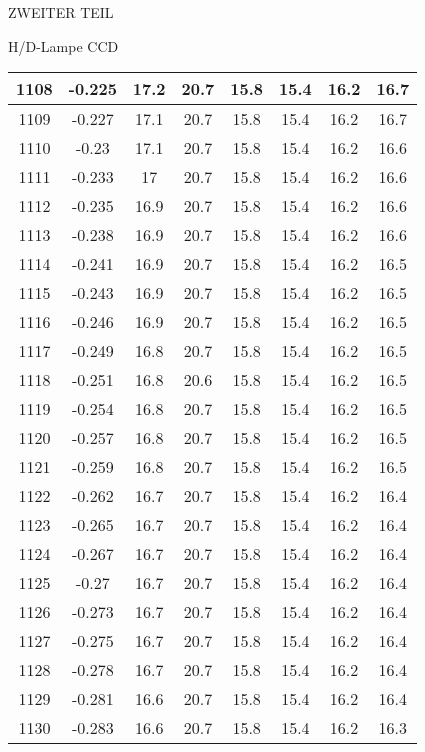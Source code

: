 \begin{appendix}
\begin{chapter}{ZWEITER TEIL}
\begin{section}{H/D-Lampe CCD}
\begin{scriptsize}
\begin{longtable}[htbp]{|c|c|c|c|c|c|c|c|}
            1108 & -0.225 & 17.2 & 20.7 & 15.8 & 15.4 & 16.2 & 16.7 \\ \hline
            1109 & -0.227 & 17.1 & 20.7 & 15.8 & 15.4 & 16.2 & 16.7 \\ \hline
            1110 & -0.23 & 17.1 & 20.7 & 15.8 & 15.4 & 16.2 & 16.6 \\ \hline
            1111 & -0.233 & 17 & 20.7 & 15.8 & 15.4 & 16.2 & 16.6 \\ \hline
            1112 & -0.235 & 16.9 & 20.7 & 15.8 & 15.4 & 16.2 & 16.6 \\ \hline
            1113 & -0.238 & 16.9 & 20.7 & 15.8 & 15.4 & 16.2 & 16.6 \\ \hline
            1114 & -0.241 & 16.9 & 20.7 & 15.8 & 15.4 & 16.2 & 16.5 \\ \hline
            1115 & -0.243 & 16.9 & 20.7 & 15.8 & 15.4 & 16.2 & 16.5 \\ \hline
            1116 & -0.246 & 16.9 & 20.7 & 15.8 & 15.4 & 16.2 & 16.5 \\ \hline
            1117 & -0.249 & 16.8 & 20.7 & 15.8 & 15.4 & 16.2 & 16.5 \\ \hline
            1118 & -0.251 & 16.8 & 20.6 & 15.8 & 15.4 & 16.2 & 16.5 \\ \hline
            1119 & -0.254 & 16.8 & 20.7 & 15.8 & 15.4 & 16.2 & 16.5 \\ \hline
            1120 & -0.257 & 16.8 & 20.7 & 15.8 & 15.4 & 16.2 & 16.5 \\ \hline
            1121 & -0.259 & 16.8 & 20.7 & 15.8 & 15.4 & 16.2 & 16.5 \\ \hline
            1122 & -0.262 & 16.7 & 20.7 & 15.8 & 15.4 & 16.2 & 16.4 \\ \hline
            1123 & -0.265 & 16.7 & 20.7 & 15.8 & 15.4 & 16.2 & 16.4 \\ \hline
            1124 & -0.267 & 16.7 & 20.7 & 15.8 & 15.4 & 16.2 & 16.4 \\ \hline
            1125 & -0.27 & 16.7 & 20.7 & 15.8 & 15.4 & 16.2 & 16.4 \\ \hline
            1126 & -0.273 & 16.7 & 20.7 & 15.8 & 15.4 & 16.2 & 16.4 \\ \hline
            1127 & -0.275 & 16.7 & 20.7 & 15.8 & 15.4 & 16.2 & 16.4 \\ \hline
            1128 & -0.278 & 16.7 & 20.7 & 15.8 & 15.4 & 16.2 & 16.4 \\ \hline
            1129 & -0.281 & 16.6 & 20.7 & 15.8 & 15.4 & 16.2 & 16.4 \\ \hline
            1130 & -0.283 & 16.6 & 20.7 & 15.8 & 15.4 & 16.2 & 16.3 \\ \hline

\end{longtable}
\end{scriptsize}
\end{section}
\end{chapter}
\end{appendix}
